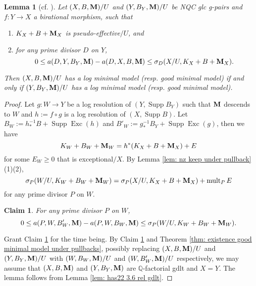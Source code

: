 \documentclass[11pt]{amsart}
\numberwithin{equation}{section}
\newcommand{\Mm}{{\bf{M}}}
\newcommand{\Qq}{\mathbb{Q}}
\newcommand{\Exc}{\operatorname{Exc}}
\newcommand{\Supp}{\operatorname{Supp}}
\newcommand{\mult}{\operatorname{mult}}
\newtheorem{lem}[thm]{Lemma}
\newtheorem{claim}[thm]{Claim}
\theoremstyle{definition}
\theoremstyle{definition}
\theoremstyle{definition}
\begin{document}
\begin{lem}[{cf. \cite[Lemma 3.6]{Has22}}]\label{lem: has22 3.6 rel} Let $(X,B,\Mm)/U$ and $(Y,B_Y,\Mm)/U$ be NQC glc g-pairs and $f: Y\rightarrow X$ a birational morphism, such that
\begin{enumerate}
    \item $K_X+B+\Mm_X$ is pseudo-effective$/U$, and
    \item for any prime divisor $D$ on $Y$,
    $$0\leq a(D,Y,B_Y,\Mm)-a(D,X,B,\Mm)\leq\sigma_D(X/U,K_X+B+\Mm_X).$$
\end{enumerate}
Then $(X,B,\Mm)/U$ has a log minimal model (resp. good minimal model) if and only if $(Y,B_Y,\Mm)/U$ has a log minimal model (resp. good minimal model).  
\end{lem}
\begin{proof}
Let $g: W\rightarrow Y$ be a log resolution of $(Y,\Supp B_Y)$ such that $\Mm$ descends to $W$ and $h:=f\circ g$ is a log resolution of $(X,\Supp B)$. Let $B_W:=h^{-1}_*B+\Supp\Exc(h)$ and $B'_W:=g^{-1}_*B_Y+\Supp\Exc(g)$, then we have
$$K_W+B_W+\Mm_W=h^*(K_X+B+\Mm_X)+E$$
for some $E_W\geq 0$ that is exceptional$/X$. By Lemma \ref{lem: nz keep under pullback}(1)(2), 
$$\sigma_P(W/U,K_W+B_W+\Mm_W)=\sigma_P(X/U,K_X+B+\Mm_X)+\mult_PE$$
for any prime divisor $P$ on $W$.
\begin{claim}\label{claim: has 3.6 change to gdlt}
For any prime divisor $P$ on $W$,
$$0\leq a(P,W,B_W',\Mm)-a(P,W,B_W,\Mm)\leq\sigma_P(W/U,K_W+B_W+\Mm_W).$$
\end{claim}
Grant Claim \ref{claim: has 3.6 change to gdlt} for the time being. By Claim \ref{claim: has 3.6 change to gdlt} and Theorem \ref{thm: existence good minimal model under pullbacks}, possibly replacing $(X,B,\Mm)/U$ and $(Y,B_Y,\Mm)/U$ with $(W,B_W,\Mm)/U$ and $(W,B_W',\Mm)/U$ respectively, we may assume that $(X,B,\Mm)$ and $(Y,B_Y,\Mm)$ are $\Qq$-factorial gdlt and $X=Y$. The lemma follows from Lemma \ref{lem: has22 3.6 rel gdlt}.
\end{proof}
\end{document}
